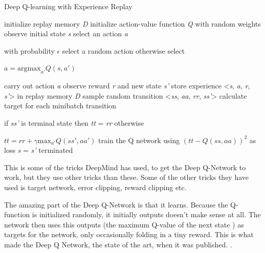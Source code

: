 \begin{algorithm}
	\caption{Deep Q-learning with Experience Replay}
	\label{algo:DQN}
	\begin{algorithmic}[]
		\State initialize replay memory \textit{D}
		\State initialize action-value function \textit{Q} with random weights
		\State observe initial state \textit{s} 
		\Repeat
			\State select an action \textit{a}
				\par with probability $\epsilon$ select a random action otherwise select 
				\par $a = \mathrm{argmax}_{a'}Q(s,a')$
		
			\State carry out action \textit{a}
			\State observe reward \textit{r} and new state \textit{s'}
			\State store experience <\textit{s}, \textit{a}, \textit{r}, \textit{s'}> in replay memory \textit{D}
			\newline
			\State sample random transition <\textit{ss}, \textit{aa}, \textit{rr}, \textit{ss'}>      
			\State calculate target for each minibatch transition
				\par if \textit{ss'} is terminal state then \textit{tt} = \textit{rr} otherwise 
				\par $tt = rr + \gamma \mathrm{max}_{a'}Q(ss',aa')$
			\State train the Q network using $(\textit{tt} - Q(\textit{ss}, \textit{aa}))^2$ as loss	
			\newline
			\State \textit{s} = \textit{s'}
		\Until terminated
	\end{algorithmic}
\end{algorithm}

This is some of the tricks DeepMind has used, to get the Deep Q-Network to work, but they use other tricks than these. Some of the other tricks they have used is target network, error clipping, reward clipping etc.  

The amazing part of the Deep Q-Network is that it learns. Because the Q-function is initialized randomly, it initially outputs doesn't make sense at all. The network then uses this outputs (the maximum Q-value of the next state ) as targets for the network, only occasionally folding in a tiny reward. This is what made the Deep Q Network, the state of the art, when it was published. \cite{DQN_theory} \cite{DQN_Flappy}.

        